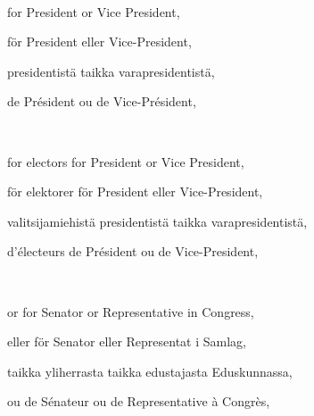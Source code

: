 \documentclass[a4,landscape,12pt]{article}
\begin{document}
~

\begin{minipage}[t]{0.22\textwidth}
	 for President or Vice President,
\end{minipage}\textwidth
\begin{minipage}[t]{0.22\textwidth}
	för President eller Vice-President,
\end{minipage}\textwidth
\begin{minipage}[t]{0.22\textwidth}
	presidentistä taikka varapresidentistä,
\end{minipage}\textwidth
\begin{minipage}[t]{0.22\textwidth}
	de Président ou de Vice-Président,
\end{minipage}

~

\begin{minipage}[t]{0.22\textwidth}
for electors for President or Vice President,
\end{minipage}\textwidth
\begin{minipage}[t]{0.22\textwidth}
för elektorer för President eller Vice-President,
\end{minipage}\textwidth
\begin{minipage}[t]{0.22\textwidth}
valitsijamiehistä presidentistä taikka varapresidentistä,
\end{minipage}\textwidth
\begin{minipage}[t]{0.22\textwidth}
d'électeurs de Président ou de Vice-President,
\end{minipage}

~

\begin{minipage}[t]{0.22\textwidth}
	 or for Senator or Representative in Congress,
\end{minipage}\textwidth
\begin{minipage}[t]{0.22\textwidth}
eller för Senator eller Representat i Samlag,
\end{minipage}\textwidth
\begin{minipage}[t]{0.22\textwidth}
	taikka yliherrasta taikka edustajasta Eduskunnassa,
\end{minipage}\textwidth
\begin{minipage}[t]{0.22\textwidth}
	ou de Sénateur ou de Representative à Congrès,
\end{minipage}
\end{document}
